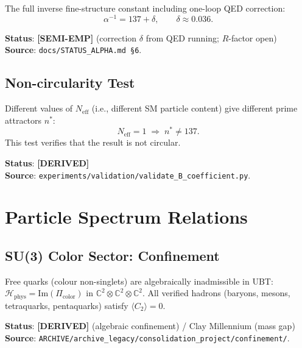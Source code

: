 \documentclass[11pt,a4paper]{article}
\theoremstyle{definition}
\theoremstyle{remark}
\begin{document}
The full inverse fine-structure constant including one-loop QED correction:
\begin{equation}
  \alpha^{-1} = 137 + \delta, \qquad \delta \approx 0.036.
\end{equation}

\noindent\textbf{Status}: \textbf{[SEMI-EMP]} (correction $\delta$ from QED running; $R$-factor open) \\
\noindent\textbf{Source}: \texttt{docs/STATUS\_ALPHA.md \S6}.

\subsection{Non-circularity Test}

Different values of $N_{\mathrm{eff}}$ (i.e., different SM particle content)
give different prime attractors $n^*$:
\begin{equation}
  N_{\mathrm{eff}} = 1 \;\Rightarrow\; n^* \neq 137.
\end{equation}
This test verifies that the result is not circular.

\noindent\textbf{Status}: \textbf{[DERIVED]} \\
\noindent\textbf{Source}: \texttt{experiments/validation/validate\_B\_coefficient.py}.

\section{Particle Spectrum Relations}\label{sec:spectrum}

\subsection{SU(3) Color Sector: Confinement}

\begin{tcolorbox}[colback=green!4!white,colframe=green!50!black,title=Algebraic prediction]
Free quarks (colour non-singlets) are algebraically inadmissible in UBT:
$\mathcal{H}_{\mathrm{phys}} = \mathrm{Im}(\Pi_{\mathrm{color}})$ in
$\mathbb{C}^2\otimes\mathbb{C}^2\otimes\mathbb{C}^2$.
All verified hadrons (baryons, mesons, tetraquarks, pentaquarks) satisfy
$\langle C_2 \rangle = 0$.
\end{tcolorbox}

\noindent\textbf{Status}: \textbf{[DERIVED]} (algebraic confinement) / Clay Millennium (mass gap) \\
\noindent\textbf{Source}: \texttt{ARCHIVE/archive\_legacy/consolidation\_project/confinement/}.
\end{document}
